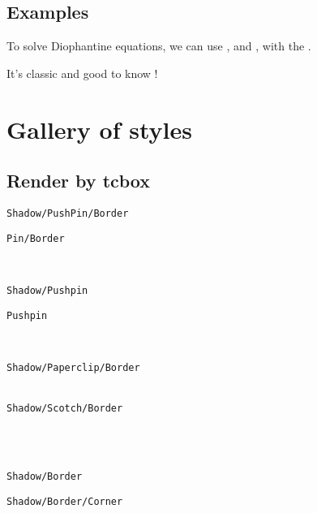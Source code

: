 \documentclass[english,a4paper,11pt]{article}
\begin{document}
\subsection{Examples}

\begin{DemoCode}[]
To solve Diophantine equations, we can use , and , with the .

It's classic and good to know !
\end{DemoCode}

\pagebreak

\section{Gallery of styles}

\subsection{Render by tcbox}

\begin{DemoCode}
\hfill\begin{PostItNote}
\texttt{Shadow/PushPin/Border}
\end{PostItNote}
\begin{PostIt}[Shadow=false]
\texttt{Pin/Border}
\end{PostIt}\hfill~

\medskip

\hfill\begin{PostItNote}[Border=false]
\texttt{Shadow/Pushpin}
\end{PostItNote}
\begin{PostItNote}[Border=false,Shadow=false]
\texttt{Pushpin}
\end{PostItNote}\hfill~

\medskip

\hfill\begin{PostItNote}[Pin=Paperclip]
\texttt{Shadow/Paperclip/Border}\\
~
\end{PostItNote}
\begin{PostItNote}[Pin=Scotch]
\texttt{Shadow/Scotch/Border}\\
~
\end{PostItNote}\hfill~

\medskip

\hfill\begin{PostItNote}[Pin=None]
\texttt{Shadow/Border}
\end{PostItNote}
\begin{PostItNote}[Corner,Pin=None]
\texttt{Shadow/Border/Corner}
\end{PostItNote}\hfill~

\vspace{1cm}

\hfill\begin{PostItNote}[Title={Lipsum[1][1-4]},FontTitle={\large\sffamily},Rotate=5,Color=pink,Height=6cm,Pin=Scotch,AlignV=center,Corner]
\lipsum[1][1-4]
\end{PostItNote}\hfill~
\end{DemoCode}
\end{document}
